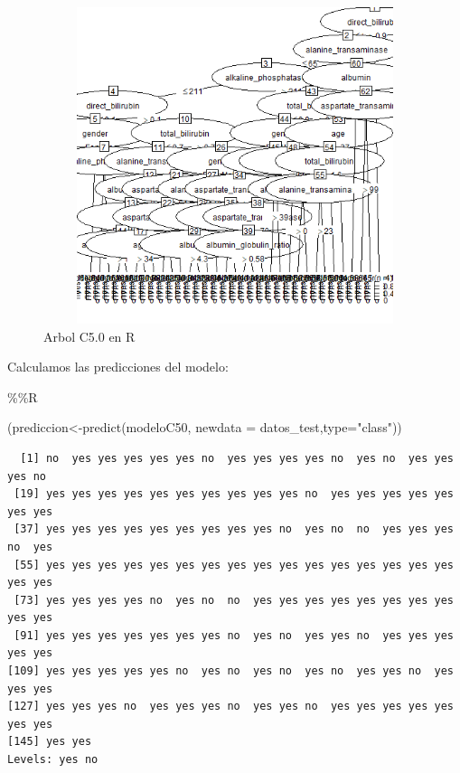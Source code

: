 \documentclass[
  11pt,
  a4paper,
]{article}
\newenvironment{Shaded}{\begin{snugshade}}{\end{snugshade}}
\newcommand{\AttributeTok}[1]{\textcolor[rgb]{0.77,0.63,0.00}{#1}}
\newcommand{\FunctionTok}[1]{\textcolor[rgb]{0.00,0.00,0.00}{#1}}
\newcommand{\NormalTok}[1]{#1}
\newcommand{\OtherTok}[1]{\textcolor[rgb]{0.56,0.35,0.01}{#1}}
\newcommand{\SpecialCharTok}[1]{\textcolor[rgb]{0.00,0.00,0.00}{#1}}
\newcommand{\StringTok}[1]{\textcolor[rgb]{0.31,0.60,0.02}{#1}}
\begin{document}
\begin{figure}
\centering
\includegraphics[width=4.6875in,height=3.64583in]{output_265_0.png}
\caption{Arbol C5.0 en R}
\end{figure}

\newpage

Calculamos las predicciones del modelo:

\begin{Shaded}
\begin{Highlighting}[]
\SpecialCharTok{\%\%}\NormalTok{R}

\NormalTok{(prediccion}\OtherTok{\textless{}{-}}\FunctionTok{predict}\NormalTok{(modeloC50, }\AttributeTok{newdata =}\NormalTok{ datos\_test,}\AttributeTok{type=}\StringTok{"class"}\NormalTok{))}
\end{Highlighting}
\end{Shaded}

\begin{verbatim}
  [1] no  yes yes yes yes yes no  yes yes yes yes no  yes no  yes yes yes no 
 [19] yes yes yes yes yes yes yes yes yes yes no  yes yes yes yes yes yes yes
 [37] yes yes yes yes yes yes yes yes yes no  yes no  no  yes yes yes no  yes
 [55] yes yes yes yes yes yes yes yes yes yes yes yes yes yes yes yes yes yes
 [73] yes yes yes yes no  yes no  no  yes yes yes yes yes yes yes yes yes yes
 [91] yes yes yes yes yes yes yes no  yes no  yes yes no  yes yes yes yes yes
[109] yes yes yes yes yes no  yes no  yes no  yes no  yes yes no  yes yes yes
[127] yes yes yes no  yes yes yes no  yes yes no  yes yes yes yes yes yes yes
[145] yes yes
Levels: yes no
\end{verbatim}
\end{document}
